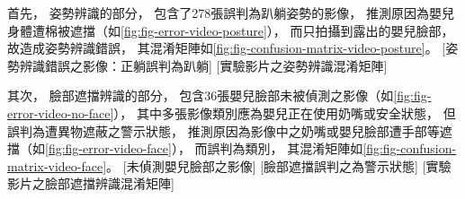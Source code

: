 \documentclass[class=NCU_thesis, crop=false]{standalone}
\begin{document}
首先，
姿勢辨識的部分，
包含了278張誤判為趴躺姿勢的影像，
推測原因為嬰兒身體遭棉被遮擋（如\cref{fig:fig-error-video-posture}），
而只拍攝到露出的嬰兒臉部，
故造成姿勢辨識錯誤，
其混淆矩陣如\cref{fig:fig-confusion-matrix-video-posture}。
[姿勢辨識錯誤之影像：正躺誤判為趴躺]
[實驗影片之姿勢辨識混淆矩陣]

其次，
臉部遮擋辨識的部分，
包含36張嬰兒臉部未被偵測之影像（如\cref{fig:fig-error-video-no-face}），
其中多張影像類別應為嬰兒正在使用奶嘴或安全狀態，
但誤判為遭異物遮蔽之警示狀態，
推測原因為影像中之奶嘴或嬰兒臉部遭手部等遮擋（如\cref{fig:fig-error-video-face}），
而誤判為類別，
其混淆矩陣如\cref{fig:fig-confusion-matrix-video-face}。
[未偵測嬰兒臉部之影像]
[臉部遮擋誤判之為警示狀態]
[實驗影片之臉部遮擋辨識混淆矩陣]
\end{document}
